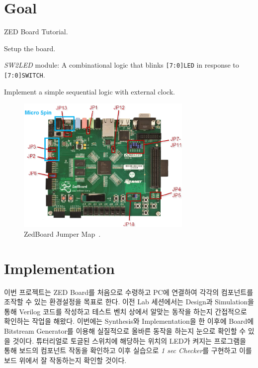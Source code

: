 \documentclass{article}
\begin{document}
\pagestyle{fancy}

\section*{Goal}

\begin{itemize*}
\item ZED Board Tutorial.
\begin{itemize*}
\item Setup the board.
\item \textit{SW2LED} module: A combinational logic that blinks \texttt{[7:0]LED} in response to \texttt{[7:0]SWITCH}.
\end{itemize*}
\item Implement a simple sequential logic with external clock.
\end{itemize*}

\begin{figure}[ht]
	\centering
	\includegraphics[width=0.75\textwidth]{fig/fig1.png}
\caption{ZedBoard Jumper Map~\cite{lab7}.}
\label{fig1}
\end{figure}

\section{Implementation}
이번 프로젝트는 ZED Board를 처음으로 수령하고 PC에 연결하여 각각의 컴포넌트를 조작할 수 있는 환경설정을 목표로 한다.
이전 Lab 세션에서는 Design과 Simulation을 통해 Verilog 코드를 작성하고 테스트 벤치 상에서 알맞는 동작을 하는지 간접적으로 확인하는 작업을 해왔다. 
이번에는 Synthesis와 Implementation을 한 이후에 Board에 Bitstream Generator를 이용해 실질적으로 올바른 동작을 하는지 눈으로 확인할 수 있을 것이다.
튜터리얼로 토글된 스위치에 해당하는 위치의 LED가 켜지는 프로그램을 통해 보드의 컴포넌트 작동을 확인하고 이후 실습으로 \textit{1 sec Checker}를 구현하고 이를 보드 위에서 잘 작동하는지 확인할 것이다.
\end{document}
